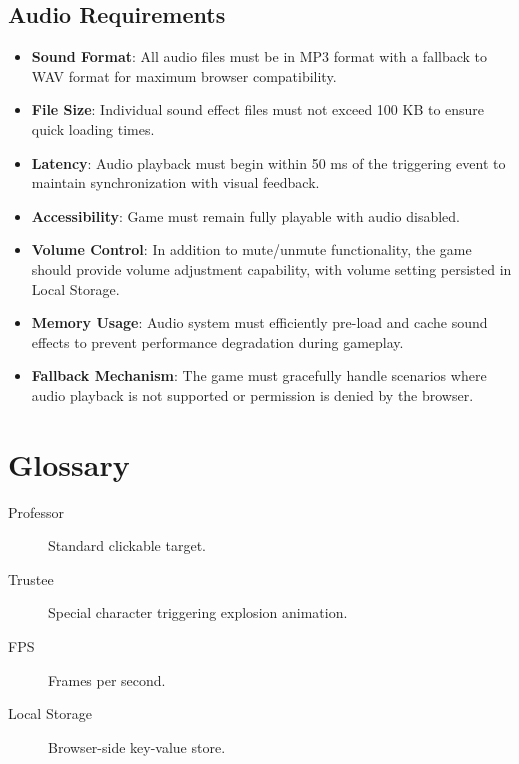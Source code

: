 \documentclass[11pt]{scrreprt}
\begin{document}
\section{Audio Requirements}
\begin{itemize}
  \item \textbf{Sound Format}: All audio files must be in MP3 format with a fallback to WAV format for maximum browser compatibility.
  \item \textbf{File Size}: Individual sound effect files must not exceed 100 KB to ensure quick loading times.
  \item \textbf{Latency}: Audio playback must begin within 50 ms of the triggering event to maintain synchronization with visual feedback.
  \item \textbf{Accessibility}: Game must remain fully playable with audio disabled.
  \item \textbf{Volume Control}: In addition to mute/unmute functionality, the game should provide volume adjustment capability, with volume setting persisted in Local Storage.
  \item \textbf{Memory Usage}: Audio system must efficiently pre-load and cache sound effects to prevent performance degradation during gameplay.
  \item \textbf{Fallback Mechanism}: The game must gracefully handle scenarios where audio playback is not supported or permission is denied by the browser.
\end{itemize}



\appendix

\chapter{Glossary}
\begin{description}
  \item[Professor] Standard clickable target.
  \item[Trustee] Special character triggering explosion animation.
  \item[FPS] Frames per second.
  \item[Local Storage] Browser-side key-value store.
\end{description}
\end{document}
